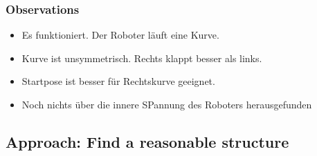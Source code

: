 \documentclass[10pt,a4paper]{article}
\begin{document}
\subsubsection{Observations}

\begin{itemize}
	\item Es funktioniert. Der Roboter läuft eine Kurve.
	\item Kurve ist unsymmetrisch. Rechts klappt besser als links.
	\item Startpose ist besser für Rechtskurve geeignet.
	\item Noch nichts über die innere SPannung des Roboters herausgefunden
\end{itemize}




\subsection{Approach: Find a reasonable structure}
\end{document}
